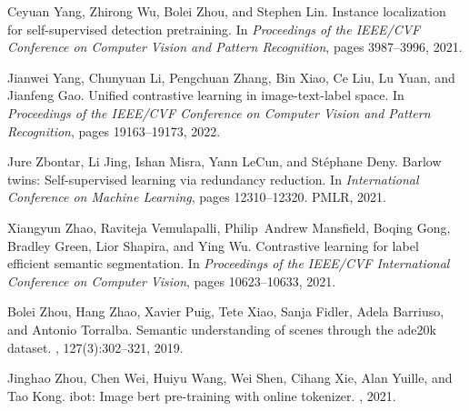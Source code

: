 \documentclass[10pt,twocolumn,letterpaper]{article}
\begin{document}
\begin{thebibliography}{10}
	Ceyuan Yang, Zhirong Wu, Bolei Zhou, and Stephen Lin.
	\newblock Instance localization for self-supervised detection pretraining.
	\newblock In {\em Proceedings of the IEEE/CVF Conference on Computer Vision and
		Pattern Recognition}, pages 3987--3996, 2021.
	
	Jianwei Yang, Chunyuan Li, Pengchuan Zhang, Bin Xiao, Ce Liu, Lu Yuan, and
	Jianfeng Gao.
	\newblock Unified contrastive learning in image-text-label space.
	\newblock In {\em Proceedings of the IEEE/CVF Conference on Computer Vision and
		Pattern Recognition}, pages 19163--19173, 2022.
	
	Jure Zbontar, Li Jing, Ishan Misra, Yann LeCun, and St{\'e}phane Deny.
	\newblock Barlow twins: Self-supervised learning via redundancy reduction.
	\newblock In {\em International Conference on Machine Learning}, pages
	12310--12320. PMLR, 2021.
	
	Xiangyun Zhao, Raviteja Vemulapalli, Philip~Andrew Mansfield, Boqing Gong,
	Bradley Green, Lior Shapira, and Ying Wu.
	\newblock Contrastive learning for label efficient semantic segmentation.
	\newblock In {\em Proceedings of the IEEE/CVF International Conference on
		Computer Vision}, pages 10623--10633, 2021.
	
	Bolei Zhou, Hang Zhao, Xavier Puig, Tete Xiao, Sanja Fidler, Adela Barriuso,
	and Antonio Torralba.
	\newblock Semantic understanding of scenes through the ade20k dataset.
	, 127(3):302--321,
	2019.
	
	Jinghao Zhou, Chen Wei, Huiyu Wang, Wei Shen, Cihang Xie, Alan Yuille, and Tao
	Kong.
	\newblock ibot: Image bert pre-training with online tokenizer.
	, 2021.
	
\end{thebibliography}
\end{document}
